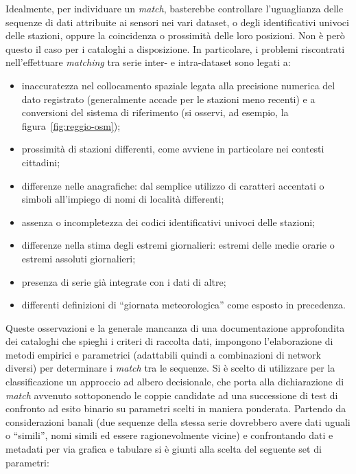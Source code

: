 Idealmente, per individuare un \emph{match}, basterebbe controllare l'uguaglianza delle sequenze di dati attribuite ai sensori nei vari dataset, o degli identificativi univoci delle stazioni, oppure la coincidenza o prossimità delle loro posizioni. Non è però questo il caso per i cataloghi a disposizione. In particolare, i problemi riscontrati nell'effettuare \emph{matching} tra serie inter- e intra-dataset sono legati a:

\begin{itemize}
  \item
    inaccuratezza nel collocamento spaziale legata alla precisione numerica del dato registrato (generalmente accade per le stazioni meno recenti) e a conversioni del sistema di riferimento (si osservi, ad esempio, la figura~\ref{fig:reggio-osm});
  \item
    prossimità di stazioni differenti, come avviene in particolare nei contesti cittadini;
  \item
    differenze nelle anagrafiche: dal semplice utilizzo di caratteri accentati o simboli all'impiego di nomi di località differenti;
  \item
    assenza o incompletezza dei codici identificativi univoci delle stazioni;
  \item
    differenze nella stima degli estremi giornalieri: estremi delle medie orarie o estremi assoluti giornalieri;
  \item
    presenza di serie già integrate con i dati di altre;
  \item
    differenti definizioni di ``giornata meteorologica'' come esposto in precedenza.
\end{itemize}

Queste osservazioni e la generale mancanza di una documentazione approfondita dei cataloghi che spieghi i criteri di raccolta dati, impongono l'elaborazione di metodi empirici e parametrici (adattabili quindi a combinazioni di network diversi) per determinare i \emph{match} tra le sequenze. Si è scelto di utilizzare per la classificazione un approccio ad albero decisionale, che porta alla dichiarazione di \emph{match} avvenuto sottoponendo le coppie candidate ad una successione di test di confronto ad esito binario su parametri scelti in maniera ponderata. Partendo da considerazioni banali (due sequenze della stessa serie dovrebbero avere dati uguali o ``simili'', nomi simili ed essere ragionevolmente vicine) e confrontando dati e metadati per via grafica e tabulare si è giunti alla scelta del seguente set di parametri:

